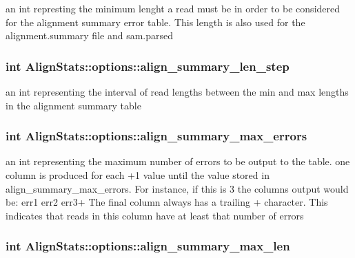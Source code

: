 \label{struct_align_stats_1_1options_ae9989ba9b255f20000d48ac1920bba31}
an int represting the minimum lenght a read must be in order to be considered for the alignment summary error table. This length is also used for the alignment.summary file and sam.parsed \hypertarget{struct_align_stats_1_1options_a2e2cd52d35bdc24f73ad1c61e8638ab0}{
\subsubsection[{align\_\-summary\_\-len\_\-step}]{\setlength{\rightskip}{0pt plus 5cm}int {\bf AlignStats::options::align\_\-summary\_\-len\_\-step}}}
\label{struct_align_stats_1_1options_a2e2cd52d35bdc24f73ad1c61e8638ab0}
an int representing the interval of read lengths between the min and max lengths in the alignment summary table \hypertarget{struct_align_stats_1_1options_a2d920885b7f36b06c6bd08d2634cabef}{
\subsubsection[{align\_\-summary\_\-max\_\-errors}]{\setlength{\rightskip}{0pt plus 5cm}int {\bf AlignStats::options::align\_\-summary\_\-max\_\-errors}}}
\label{struct_align_stats_1_1options_a2d920885b7f36b06c6bd08d2634cabef}
an int representing the maximum number of errors to be output to the table. one column is produced for each +1 value until the value stored in align\_\-summary\_\-max\_\-errors. For instance, if this is 3 the columns output would be: err1 err2 err3+ The final column always has a trailing + character. This indicates that reads in this column have at least that number of errors \hypertarget{struct_align_stats_1_1options_a119003c51a782cc237af14b164d529a3}{
\subsubsection[{align\_\-summary\_\-max\_\-len}]{\setlength{\rightskip}{0pt plus 5cm}int {\bf AlignStats::options::align\_\-summary\_\-max\_\-len}}}
